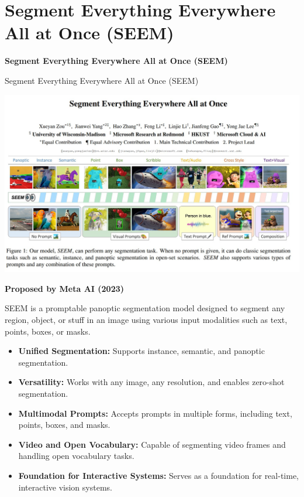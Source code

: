 \section{Segment Everything Everywhere All at Once (SEEM)}
\begin{frame}{}
    \LARGE \textbf{Segment Everything Everywhere All at Once (SEEM)}
\end{frame}

\begin{frame}[allowframebreaks]{Segment Everything Everywhere All at Once (SEEM)}

\begin{center}
    \includegraphics[width=\textwidth,height=0.9\textheight]{images/recent-advance/seem-paper.png}
\end{center}

\framebreak

\textbf{Proposed by Meta AI (2023)}

SEEM is a promptable panoptic segmentation model designed to segment any region, object, or stuff in an image using various input modalities such as text, points, boxes, or masks.

\begin{itemize}
    \item \textbf{Unified Segmentation:} Supports instance, semantic, and panoptic segmentation.
    \item \textbf{Versatility:} Works with any image, any resolution, and enables zero-shot segmentation.
    \item \textbf{Multimodal Prompts:} Accepts prompts in multiple forms, including text, points, boxes, and masks.
    \item \textbf{Video and Open Vocabulary:} Capable of segmenting video frames and handling open vocabulary tasks.
    \item \textbf{Foundation for Interactive Systems:} Serves as a foundation for real-time, interactive vision systems.
\end{itemize}


\end{frame}
